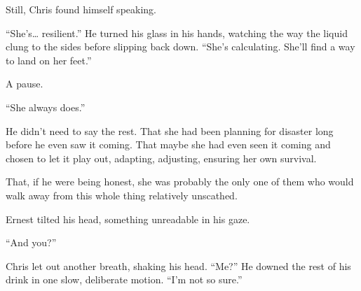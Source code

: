 Still, Chris found himself speaking.  

“She’s… resilient.” He turned his glass in his hands, watching the way the liquid clung to the sides before slipping back down. “She’s calculating. She’ll find a way to land on her feet.”  

A pause.  

“She always does.” 

He didn’t need to say the rest. That she had been planning for disaster long before he even saw it coming. That maybe she had even seen it coming and chosen to let it play out, adapting, adjusting, ensuring her own survival.  

That, if he were being honest, she was probably the only one of them who would walk away from this whole thing relatively unscathed.  

Ernest tilted his head, something unreadable in his gaze.  

“And you?” 

Chris let out another breath, shaking his head. “Me?” He downed the rest of his drink in one slow, deliberate motion.  “I’m not so sure.”

\newpage
